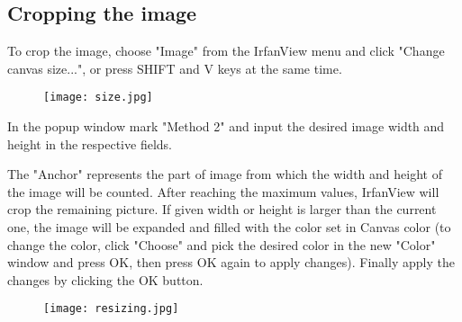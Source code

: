 \documentclass[
	fontsize=10pt, 
	twoside=true, 
	numbers=noenddot, 
]{kaobook}
\begin{document}
\subsection{Cropping the image}
\par To crop the image, choose "Image" from the IrfanView menu and click "Change canvas size...", or press SHIFT and V keys at the same time.
\begin{figure}[h]
    \centering
    \texttt{[image: size.jpg]}
\end{figure}
\par In the popup window mark "Method 2" and input the desired image width and height in the respective fields.
\par The "Anchor" represents the part of image from which the width and height of the image will be counted. After reaching the maximum values, IrfanView will crop the remaining picture. If given width or height is larger than the current one, the image will be expanded and filled with the color set in Canvas color (to change the color, click "Choose" and pick the desired color in the new "Color" window and press OK, then press OK again to apply changes). Finally apply the changes by clicking the OK button.
\begin{figure}[h]
    \centering
    \texttt{[image: resizing.jpg]}
\end{figure}
\end{document}
